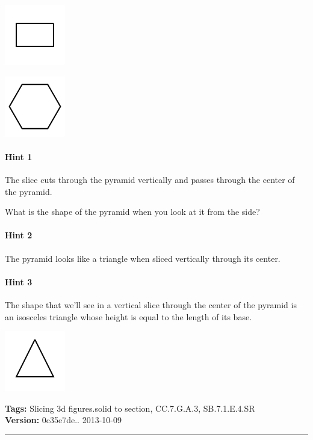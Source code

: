 \documentclass[twocolumn,10pt]{article}
\def\shrinkfactor{0.4}
\begin{document}
\includegraphics[scale=\shrinkfactor]{figures/0e5042b475e0847d67b74c0482f8e8173f798656.png}


\includegraphics[scale=\shrinkfactor]{figures/0245164f3f4897772e76d361f955075a80732b03.png}



\paragraph{Hint 1}The slice cuts through the pyramid vertically and passes through the center of the pyramid.

What is the shape of the pyramid when you look at it from the side?

\paragraph{Hint 2}The pyramid looks like a triangle when sliced vertically through its center.

\paragraph{Hint 3}The shape that we'll see in a vertical slice through the center of the pyramid is an isosceles triangle whose height is equal to the length of its base.  

\includegraphics[scale=\shrinkfactor]{figures/d443e0deb4dc18ef30fbf9139d310266f460b66b.png}




\medskip
\noindent
\textbf{Tags:} {\footnotesize Slicing 3d figures.solid to section, CC.7.G.A.3, SB.7.1.E.4.SR}\\
\textbf{Version:} 0c35e7de.. 2013-10-09
\smallskip\hrule
\end{document}
